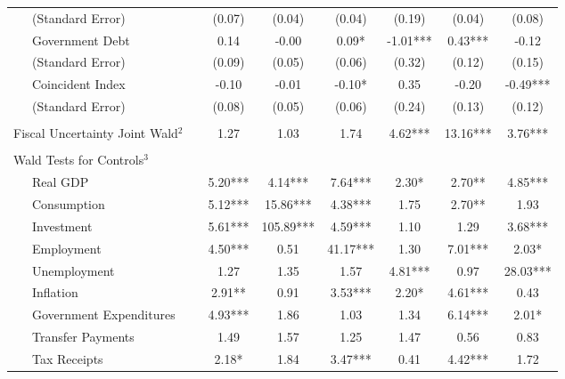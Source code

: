 \begin{table}
{\begin{center}
\begin{tabular}{l|S[table-format=3.2] S[table-format=3.2] S[table-format=3.2] S[table-format=3.2] S[table-format=3.2] S[table-format=3.2]}
~~~(Standard Error) & (0.07) & (0.04) & (0.04) & (0.19) & (0.04) & (0.08) \\ [0.2pc]
~~~Government Debt & 0.14 & -0.00 & 0.09* & -1.01*** & 0.43*** & -0.12 \\
~~~(Standard Error) & (0.09) & (0.05) & (0.06) & (0.32) & (0.12) & (0.15) \\ [0.2pc]
~~~Coincident Index & -0.10 & -0.01 & -0.10* & 0.35 & -0.20 & -0.49*** \\
~~~(Standard Error) & (0.08) & (0.05) & (0.06) & (0.24) & (0.13) & (0.12) \\ [0.2pc]
\hline
 &  \\ [-0.25pc]
Fiscal Uncertainty Joint Wald$^2$~~ & 1.27 & 1.03 & 1.74 & 4.62*** & 13.16*** & 3.76*** \\ [0.5pc] \hline
 &  \\ [-0.25pc]
Wald Tests for Controls$^3$ &  \\ [0.5pc]
~~~Real GDP & 5.20*** & 4.14*** & 7.64*** & 2.30* & 2.70** & 4.85*** \\
~~~Consumption & 5.12*** & 15.86*** & 4.38*** & 1.75 & 2.70** & 1.93 \\
~~~Investment & 5.61*** & 105.89*** & 4.59*** & 1.10 & 1.29 & 3.68*** \\
~~~Employment & 4.50*** & 0.51 & 41.17*** & 1.30 & 7.01*** & 2.03* \\
~~~Unemployment & 1.27 & 1.35 & 1.57 & 4.81*** & 0.97 & 28.03*** \\
~~~Inflation & 2.91** & 0.91 & 3.53*** & 2.20* & 4.61*** & 0.43 \\
~~~Government Expenditures & 4.93*** & 1.86 & 1.03 & 1.34 & 6.14*** & 2.01* \\
~~~Transfer Payments & 1.49 & 1.57 & 1.25 & 1.47 & 0.56 & 0.83 \\
~~~Tax Receipts & 2.18* & 1.84 & 3.47*** & 0.41 & 4.42*** & 1.72 \\



\end{tabular}
\end{center}}
\end{table}
